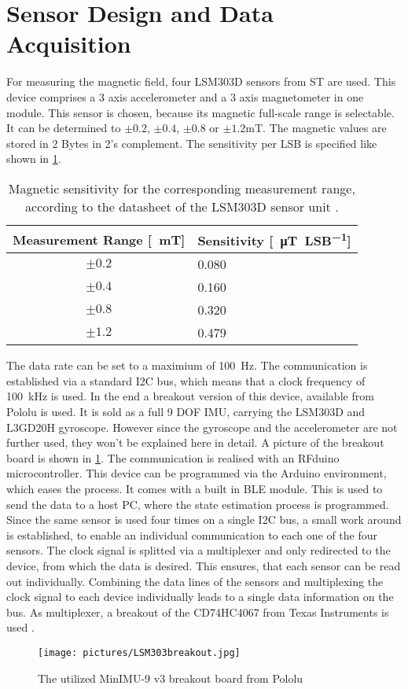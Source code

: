 \section{Sensor Design and Data Acquisition} \label{cha:sensors}

For measuring the magnetic field, four LSM303D sensors \cite{STlsm2012} from ST are used. This device comprises a 3 axis accelerometer and a 3 axis magnetometer in one module. This sensor is chosen, because its magnetic full-scale range is selectable. It can be determined to $ \pm 0.2$, $ \pm 0.4 $, $ \pm 0.8 $ or $ \pm 1.2\si{\milli\tesla} $. The magnetic values are stored in 2 Bytes in 2's complement. The sensitivity per \ac{LSB} is specified like shown in \ref{tab:magSensitivity}.
\begin{table}[h]
\centering
\begin{tabular}{c|l}
\textbf{Measurement Range [\SI{}{\milli\tesla}]} & \textbf{Sensitivity [\SI{}{\micro\tesla \per LSB}]} \\ \hline
$ \pm 0.2 $ & 0.080 \\ \hline
$ \pm 0.4 $ & 0.160 \\ \hline
$ \pm 0.8 $ & 0.320 \\ \hline
$ \pm 1.2 $ & 0.479 \\ %
\end{tabular}
\caption[Magnetic sensitivity]{Magnetic sensitivity for the corresponding measurement range, according to the datasheet of the LSM303D sensor unit \cite{STlsm2012}.}
\label{tab:magSensitivity}
\end{table}
The data rate can be set to a maximium of \SI{100}{\Hz}. The communication is established via a standard I2C bus, which means that a clock frequency of \SI{100}{\kilo \Hz} is used. In the end a breakout version of this device, available from Pololu \cite{pol2016} is used. It is sold as a full 9 \ac{DOF} IMU, carrying the LSM303D and L3GD20H gyroscope. However since the gyroscope and the accelerometer are not further used, they won't be explained here in detail. A picture of the breakout board is shown in \ref{fig:breakout}. The communication is realised with an RFduino microcontroller. This device can be programmed via the Arduino environment, which eases the process. It comes with a built in \ac{BLE} module. This is used to send the data to a host PC, where the state estimation process is programmed. Since the same sensor is used four times on a single I2C bus, a small work around is established, to enable an individual communication to each one of the four sensors. The clock signal is splitted via a multiplexer and only redirected to the device, from which the data is desired. This ensures, that each sensor can be read out individually. Combining the data lines of the sensors and multiplexing the clock signal to each device individually leads to a single data information on the bus. As multiplexer, a breakout of the CD74HC4067 from Texas Instruments is used \cite{TImux2003}.
\begin{figure}
\centering
\texttt{[image: pictures/LSM303breakout.jpg]}
\caption[Breakout board of sensor unit]
{The utilized MinIMU-9 v3 breakout board from Pololu \cite{pol2016}}
\label{fig:breakout}
\end{figure}


